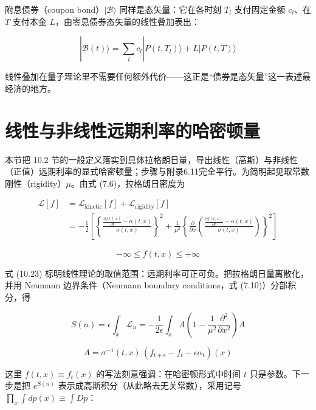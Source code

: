 附息债券（coupon bond）$|\mathcal{B}\rangle$ 同样是态矢量：它在各时刻 $T_l$ 支付固定金额 $c_l$、在 $T$ 支付本金 $L$，由零息债券态矢量的线性叠加表出：

\begin{equation*}
|\mathcal{B}(t)\rangle=\sum_l c_l|P(t,T_l)\rangle+L|P(t,T)\rangle
\end{equation*}

线性叠加在量子理论里不需要任何额外代价——这正是“债券是态矢量”这一表述最经济的地方。

\section{线性与非线性远期利率的哈密顿量}

本节把 10.2 节的一般定义落实到具体拉格朗日量，导出线性（高斯）与非线性（正值）远期利率的显式哈密顿量；步骤与附录6.11完全平行。为简明起见取常数刚性（rigidity）$\mu$。由式 (7.6)，拉格朗日密度为

\begin{equation*}
\begin{aligned}
\mathcal{L}[f]&=\mathcal{L}_{\text{kinetic}}[f]+\mathcal{L}_{\text{rigidity}}[f]\\
&=-\frac{1}{2}\left[\left\{\frac{\frac{\partial f(t,x)}{\partial t}-\alpha(t,x)}{\sigma(t,x)}\right\}^2
+\frac{1}{\mu^2}\left\{\frac{\partial}{\partial x}\left(\frac{\frac{\partial f(t,x)}{\partial t}-\alpha(t,x)}{\sigma(t,x)}\right)\right\}^2\right]
\end{aligned}
\tag{10.22}
\end{equation*}

\begin{equation*}
-\infty\le f(t,x)\le+\infty
\tag{10.23}
\end{equation*}

式 (10.23) 标明线性理论的取值范围：远期利率可正可负。把拉格朗日量离散化，并用 Neumann 边界条件（Neumann boundary conditions，式 (7.10)）分部积分，得

\begin{equation*}
S(n)=\epsilon\int_x\mathcal{L}_n=-\frac{1}{2\epsilon}\int_x A\left(1-\frac{1}{\mu^2}\frac{\partial^2}{\partial x^2}\right)A
\tag{10.24}
\end{equation*}

\begin{equation*}
A=\sigma^{-1}(t,x)\,(f_{t+\epsilon}-f_t-\epsilon\alpha_t)(x)
\tag{10.25}
\end{equation*}

这里 $f(t,x)\equiv f_t(x)$ 的写法刻意强调：在哈密顿形式中时间 $t$ 只是参数。下一步是把 $e^{S(n)}$ 表示成高斯积分（从此略去无关常数），采用记号 $\prod_x\int dp(x)\equiv\int Dp$：


